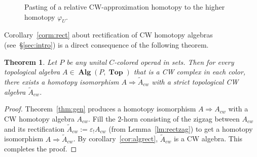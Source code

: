 \documentclass{amsart}
\newtheorem{theorem}[formula]{Theorem}
\theoremstyle{definition}
\theoremstyle{remark}
\newcommand{\eps}{\varepsilon}
\DeclareMathOperator{\Top}{\mathbf{Top}}
\DeclareMathOperator{\Alg}{\mathbf{Alg}}
\renewcommand{\phi}{\varphi}
\begin{document}
	\begin{figure}
		\centering
		\begin{minipage}[t]{0.1\textwidth}
			\centering
		\end{minipage}
		\begin{minipage}[t]{0.1\textwidth}
			\centering
		\end{minipage}
		\begin{minipage}[t]{0.1\textwidth}
			\centering
		\end{minipage}
		\caption{Pasting of a relative CW-approximation homotopy to the higher homotopy $\phi_{U}$.
		}\label{fig:hompas}
	\end{figure}
	
	Corollary~\ref{corm:rect} about rectification of CW homotopy algebras (see~\S\ref{sec:intro}) is a direct consequence of the following theorem.
	

	\begin{theorem}\label{thm:cwapp}
		Let $P$ be any unital $C$-colored operad in sets.
		Then for every topological algebra $A\in \Alg(P,\Top)$ that is a CW complex in each color, there exists a homotopy isomorphism $A\Rightarrow \widetilde{A}_{cw}$ with a strict topological CW algebra $\widetilde{A}_{cw}$.
	\end{theorem}

	\begin{proof}
		Theorem~\ref{thm:gen} produces a homotopy isomorphism $A\Rightarrow A_{cw}$ with a CW homotopy algebra $A_{cw}$.
		Fill the $2$-horn consisting of the zigzag between $A_{cw}$ and its rectification $\widetilde{A}_{cw}:=\eps_{!} A_{cw}$ (from Lemma~\ref{lm:rectzag}) to get a homotopy isomorphism $A\Rightarrow \widetilde{A}_{cw}$.
		By corollary~\ref{cor:algrect}, $\widetilde{A}_{cw}$ is a CW algebra.
		This completes the proof.
	\end{proof}
\end{document}
